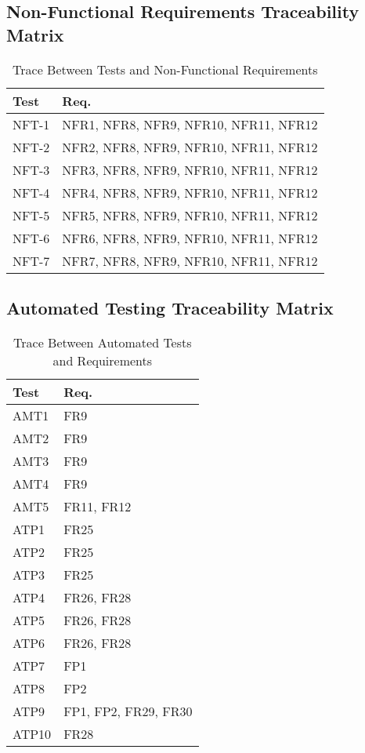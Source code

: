 \documentclass[12pt, titlepage]{article}
\begin{document}
\subsection{Non-Functional Requirements Traceability Matrix}
\begin{table}[H]
\centering
\begin{tabular}{p{} p{}}
\toprule
\textbf{Test} & \textbf{Req.}\\
\midrule
NFT-1 & NFR1, NFR8, NFR9, NFR10, NFR11, NFR12\\
NFT-2 & NFR2, NFR8, NFR9, NFR10, NFR11, NFR12\\
NFT-3 & NFR3, NFR8, NFR9, NFR10, NFR11, NFR12\\
NFT-4 & NFR4, NFR8, NFR9, NFR10, NFR11, NFR12\\
NFT-5 & NFR5, NFR8, NFR9, NFR10, NFR11, NFR12\\
NFT-6 & NFR6, NFR8, NFR9, NFR10, NFR11, NFR12\\
NFT-7 & NFR7, NFR8, NFR9, NFR10, NFR11, NFR12\\
\bottomrule
\end{tabular}
\caption{Trace Between Tests and Non-Functional Requirements}
\label{TblTNFR}
\end{table}

\newpage

\subsection{Automated Testing Traceability Matrix}
\begin{table}[H]
\centering
\begin{tabular}{p{} p{}}
\toprule
\textbf{Test} & \textbf{Req.}\\
\midrule
AMT1 & FR9\\
AMT2 & FR9\\
AMT3 & FR9\\
AMT4 & FR9\\
AMT5 & FR11, FR12\\
ATP1 & FR25\\
ATP2 & FR25\\
ATP3 & FR25\\
ATP4 & FR26, FR28\\
ATP5 & FR26, FR28\\
ATP6 & FR26, FR28\\
ATP7 & FP1\\
ATP8 & FP2\\
ATP9 & FP1, FP2, FR29, FR30\\
ATP10 & FR28\\
\bottomrule
\end{tabular}
\caption{Trace Between Automated Tests and Requirements}
\label{TblTATR}
\end{table}
\end{document}

